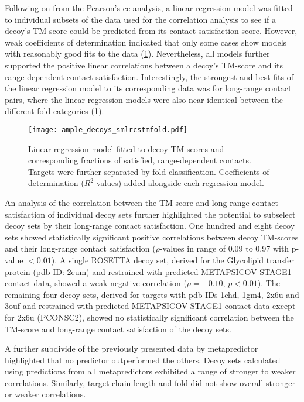 Following on from the Pearson's \gls{cc} analysis, a linear regression model was fitted to individual subsets of the data used for the correlation analysis to see if a decoy's TM-score could be predicted from its contact satisfaction score. However, weak coefficients of determination indicated that only some cases show models with reasonably good fits to the data (\cref{fig:ample_decoys_smlrcstmfold}). Nevertheless, all models further supported the positive linear correlations between a decoy's TM-score and its range-dependent contact satisfaction. Interestingly, the strongest and best fits of the linear regression model to its corresponding data was for long-range contact pairs, where the linear regression models were also near identical between the different fold categories (\cref{fig:ample_decoys_smlrcstmfold}).

\begin{figure}[H]
	\centering
	\texttt{[image: ample\_decoys\_smlrcstmfold.pdf]}
        \caption[Regression model between decoy TM-score and contact satisfaction]{Linear regression model fitted to decoy TM-scores and corresponding fractions of satisfied, range-dependent contacts. Targets were further separated by fold classification. Coefficients of determination ($R^2$-values) added alongside each regression model.}
	\label{fig:ample_decoys_smlrcstmfold}
\end{figure}

An analysis of the correlation between the TM-score and long-range contact satisfaction of individual decoy sets further highlighted the potential to subselect decoy sets by their long-range contact satisfaction. One hundred and eight decoy sets showed statistically significant positive correlations between decoy TM-scores and their long-range contact satisfaction ($\rho$-values in range of 0.09 to 0.97 with p-value $<0.01$). A single ROSETTA decoy set, derived for the Glycolipid transfer protein (\gls{pdb} ID: 2eum) and restrained with predicted METAPSICOV STAGE1 contact data, showed a weak negative correlation ($\rho=-0.10$, $p<0.01$). The remaining four decoy sets, derived for targets with \gls{pdb} IDs 1chd, 1gm4, 2x6u and 3ouf and restrained with predicted METAPSICOV STAGE1 contact data except for 2x6u (PCONSC2), showed no statistically significant correlation between the TM-score and long-range contact satisfaction of the decoy sets. 

A further subdivide of the previously presented data by metapredictor highlighted that no predictor outperformed the others. Decoy sets calculated using predictions from all metapredictors exhibited a range of stronger to weaker correlations. Similarly, target chain length and fold did not show overall stronger or weaker correlations. 


